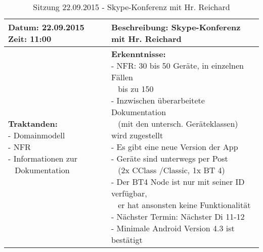 \begin{table}[H]
\begin{tabularx}{\textwidth}{| l | X |}
\hline
\textbf{Datum:} 22.09.2015
\textbf{Zeit:} 11:00
&
\textbf{Beschreibung:} Skype-Konferenz mit Hr. Reichard \\ \hline
\specialcell[t]{
\textbf{Traktanden:}\\
- Domainmodell\\
- NFR\\
- Informationen zur\\~ Dokumentation\\
}
& 
\specialcell[t]{
\textbf{Erkenntnisse:}\\
- NFR: 30 bis 50 Geräte, in einzelnen Fällen\\~ bis zu 150\\
- Inzwischen überarbeitete Dokumentation\\~ (mit den untersch. Geräteklassen) wird zugestellt\\
- Es gibt eine neue Version der App\\
- Geräte sind unterwegs per Post\\~ (2x CClass /Classic, 1x BT 4)\\
- Der BT4 Node ist nur mit seiner ID verfügbar,\\~ er hat ansonsten keine Funktionalität\\
- Nächster Termin: Nächster Di 11-12\\
- Minimale Android Version 4.3 ist bestätigt\\
}
\\ \hline
\end{tabularx}
\caption{Sitzung 22.09.2015 - Skype-Konferenz mit Hr. Reichard}
\end{table}